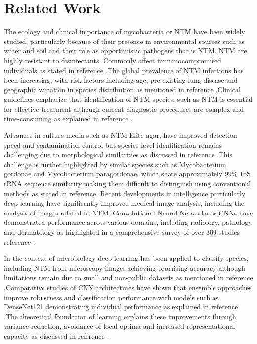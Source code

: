 \documentclass[journal,article,submit,pdftex,moreauthors]{Definitions/mdpi}
\begin{document}
\section{Related Work}

The ecology and clinical importance of mycobacteria or NTM have been widely studied, particularly because of their presence in environmental sources such as water and soil and their role as opportunistic pathogens that is NTM. NTM are highly resistant to disinfectants. Commonly affect immunocompromised individuals as stated in reference \cite{falkinham2021}.The global prevalence of NTM infections has been increasing, with risk factors including age, pre-existing lung disease and geographic variation in species distribution as mentioned in reference \cite{prevots2015}.Clinical guidelines emphasize that identification of NTM species, such as NTM is essential for effective treatment although current diagnostic procedures are complex and time-consuming as explained in reference \cite{griffith2007}. 

Advances in culture media such as NTM Elite agar, have improved detection speed and contamination control but species-level identification remains challenging due to morphological similarities as discussed in reference \cite{biomerieux2023}.This challenge is further highlighted by similar species such as Mycobacterium gordonae and Mycobacterium paragordonae, which share approximately 99\% 16S rRNA sequence similarity making them difficult to distinguish using conventional methods as stated in reference \cite{turenne2018}.Recent developments in intelligence particularly deep learning have significantly improved medical image analysis, including the analysis of images related to NTM. Convolutional Neural Networks or CNNs have demonstrated performance across various domains, including radiology, pathology and dermatology as highlighted in a comprehensive survey of over 300 studies reference \cite{litjens2017}.

In the context of microbiology deep learning has been applied to classify species, including NTM from microscopy images achieving promising accuracy although limitations remain due to small and non-public datasets as mentioned in reference \cite{smith2023}.Comparative studies of CNN architectures have shown that ensemble approaches improve robustness and classification performance with models such as DenseNet121 demonstrating individual performance as explained in reference \cite{pan2022}.The theoretical foundation of learning explains these improvements through variance reduction, avoidance of local optima and increased representational capacity as discussed in reference \cite{dietterich2000}.
 
\end{document}
